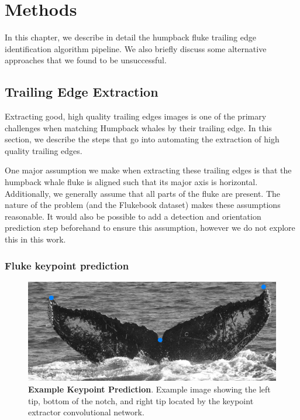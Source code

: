   
\chapter{Methods} \label{sec:methods}

In this chapter, we describe in detail the humpback fluke trailing edge identification algorithm pipeline.
We also briefly discuss some alternative approaches that we found to be unsuccessful.

\section{Trailing Edge Extraction}

Extracting good, high quality trailing edges images is one of the primary challenges when matching Humpback whales by their trailing edge.
In this section, we describe the steps that go into automating the extraction of high quality trailing edges.

One major assumption we make when extracting these trailing edges is that the humpback whale fluke is aligned such that its major axis is horizontal.
Additionally, we generally assume that all parts of the fluke are present.
The nature of the problem (and the Flukebook dataset) makes these assumptions reasonable.
It would also be possible to add a detection and orientation prediction step beforehand to ensure this assumption, however we do not explore this in this work.

\subsection{Fluke keypoint prediction}


\begin{figure}[t]%
\centering
\includegraphics[width=1.0\textwidth]{../images/aid88_kpoverlay.png}
\caption{\textbf{Example Keypoint Prediction}. Example image showing the left tip, bottom of the notch, and right tip located by the keypoint extractor convolutional network.}
\label{fig:example_kp}
\end{figure}

